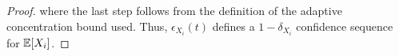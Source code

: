 \begin{proof}

where the last step follows from the definition of the adaptive concentration bound used.
Thus, $\epsilon_{X_i}(t)$ defines a $1 - \delta_{X_i}$ confidence sequence for $\mathbb{E}[X_i]$.

\end{proof}
